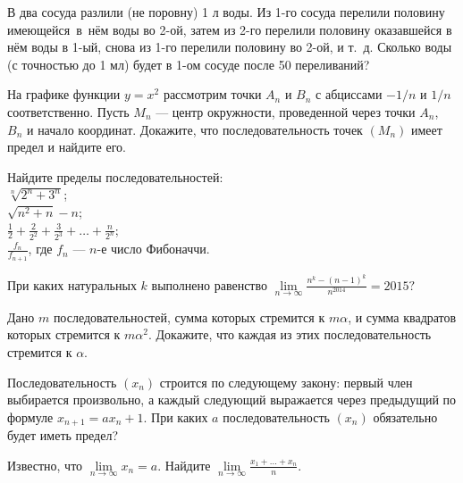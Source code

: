\documentclass[a4paper, 12pt]{article}
\begin{document}


 В два сосуда разлили (не поровну)
1 л воды. Из 1-го сосуда перелили
половину имеющейся~в~н\"ем
воды
во 2-ой, затем из 2-го перелили половину оказавшейся
в н\"ем воды в 1-ый, %
снова из 1-го  пере\-ли\-ли половину
во 2-ой, и т.~д.
Сколько воды (с точностью до 1 мл) будет в 1-ом
сосуде после 50 переливаний?

 На графике функции $y=x^2$ рассмотрим точки $A_n$ и $B_n$
с абциссами $-1/n$ и $1/n$ соответственно. Пусть $M_n$ --- центр
окружности, проведенной через точки $A_n$, $B_n$ и начало координат.
Докажите, что последовательность точек $(M_n)$ имеет предел
и найдите его.


 Найдите пределы последовательностей:\\
\medskip
{} $\sqrt[n]{2^n+3^n}$;\\
\medskip
{} $\sqrt{n^2+n}-n$;\\
\smallskip
{} $\displaystyle{\frac12+\frac2{2^2}+\frac3{2^3}+\ldots+\frac{n}{2^n}}$;\\
\smallskip
{} $\displaystyle{\frac{f_n}{f_{n+1}}}$, где $f_n$ --- $n$-е число Фибоначчи.


При каких натуральных $k$ выполнено равенство
$
\displaystyle{
\lim\limits_{n\rightarrow\infty}\frac{n^k-(n-1)^k}{n^{2014}}=2015?}
$

Дано $m$ последовательностей, сумма которых
стремится к $m\alpha$, и сумма квадратов которых
стремится к $m\alpha^2$. Докажите, что каждая из этих
последовательность стремится к $\alpha$.

 Последовательность $(x_n)$ строится по следующему закону:
первый член выбирается произвольно, а каждый следующий выражается
через предыдущий по формуле $x_{n+1}=ax_n+1$. При каких $a$
последовательность $(x_n)$ обязательно будет иметь предел?

 Известно, что $\lim\limits_{n \to \infty} x_n = a$.
Найдите
$\displaystyle{\lim\limits_{n \to \infty}\!\frac{x_1+\ldots+x_n}n}$.
\end{document}
